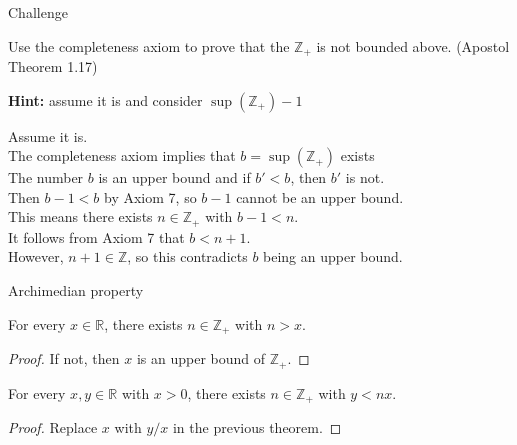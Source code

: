 \documentclass{beamer}
\begin{document}
\begin{frame}{Challenge}
\begin{prob}
Use the completeness axiom to prove that the $\mathbb Z_+$ is not bounded above.
(Apostol Theorem 1.17)
\end{prob}
\pause
\textbf{Hint:} assume it is and consider $\sup(\mathbb Z_+)-1$
\pause
\begin{soln}
Assume it is.\\\pause
The completeness axiom implies that $b=\sup(\mathbb Z_+)$ exists\\\pause
The number $b$ is an upper bound and if $b' < b$, then $b'$ is not.\\\pause
Then $b-1 < b$ by Axiom 7, so $b-1$ cannot be an upper bound.\\\pause
This means there exists $n\in\mathbb{Z}_+$ with $b-1 < n$.\\\pause
It follows from Axiom 7 that $b < n+1$.\\\pause
However, $n+1\in\mathbb{Z}$, so this contradicts $b$ being an upper bound.
\end{soln}
\end{frame}

\begin{frame}{Archimedian property}
\begin{thm}
For every $x\in\mathbb{R}$, there exists $n\in\mathbb{Z}_+$ with $n>x$.
\end{thm}
\pause
\begin{proof}
If not, then $x$ is an upper bound of $\mathbb{Z}_+$.
\end{proof}
\pause
\begin{thm}
For every $x,y\in\mathbb{R}$ with $x>0$, there exists $n\in\mathbb{Z}_+$ with $y<nx$.
\end{thm}
\pause
\begin{proof}
Replace $x$ with $y/x$ in the previous theorem.
\end{proof}
\end{frame}
\end{document}
